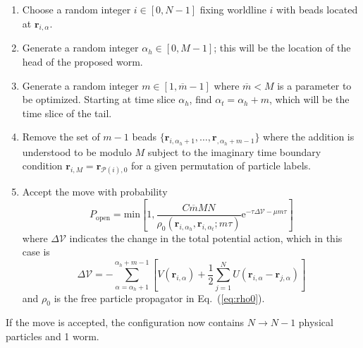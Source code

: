 \documentclass[prb,10pt,aps,floatfix,notitlepage]{revtex4-1}
\renewcommand{\vec}[1]{\boldsymbol{#1}}
\newcommand{\e}[1]{\mathrm{e}^{#1}}
\renewcommand{\eqref}[1]{Eq.~(\ref{#1})}
\begin{document}
\begin{enumerate}
    \item Choose a random integer $i \in [0,N-1]$ fixing worldline $i$ with beads located
        at $\vec{r}_{i,\alpha}$.
    \item Generate a random integer $\alpha_h \in [0,M-1]$; this
        will be the location of the head of the proposed worm.
    \item Generate a random integer $m \in [1,\overline{m}-1]$ where $\overline{m} <
        M$ is a parameter to be optimized. Starting at time slice $\alpha_h$,
        find $\alpha_t = \alpha_h + m$, which will be the time slice of the tail.
    \item Remove the set of $m-1$ beads
        $\{\vec{r}_{i,\alpha_h+1},\ldots,
    \vec{r}_{,\alpha_h+m-1}\}$ where the addition is
    understood to be modulo $M$ subject to the imaginary time boundary
    condition $\vec{r}_{i,M} = \vec{r}_{\mathcal{P}(i),0}$ for a given
    permutation of particle labels.
\item Accept the move with probability
\begin{equation}
P_{\text{open}} = \mathrm{min}\left[1, 
    \frac{C \overline{m} M N}{\rho_0(\vec{r}_{i,\alpha_h},\vec{r}_{i,\alpha_t};m\tau)}
\e{-\tau \Delta \mathcal{V} - \mu m \tau} \right]
\end{equation}
%
where $\Delta \mathcal{V}$ indicates the change in the total potential action,
which in this case is
%
\begin{equation}
    \Delta\mathcal{V} = -\sum_{\alpha=\alpha_h+1}^{\alpha_h+m-1} \left[ 
        V(\vec{r}_{i,\alpha}) + \frac{1}{2}\sum_{j=1}^N
        U(\vec{r}_{i,\alpha}-\vec{r}_{j,\alpha}) \right]
\end{equation}
%
and $\rho_0$ is the free particle propagator in \eqref{eq:rho0}.
\end{enumerate}
If the move is accepted, the configuration now contains $N \to N-1$ physical
particles and 1 worm.\\[2ex]
%
\end{document}
